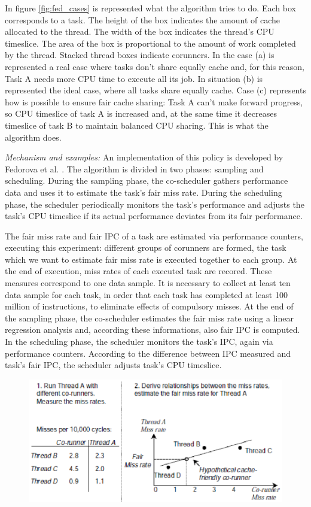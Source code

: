 \begin{description}
In figure \ref{fig:fed_cases} is represented what the algorithm tries to do. Each box corresponds to a task. The height of the box indicates the amount of
cache allocated to the thread. The width of the box indicates the thread's CPU timeslice. The area of the box is proportional to the amount of work 
completed by the thread. Stacked thread boxes indicate corunners. In the case (a) is represented a real case where tasks don't share equally cache and, for 
this reason, Task A needs more CPU time to execute all its job. In situation (b) is represented the ideal case, where all tasks share equally 
cache. Case (c) represents how is possible to ensure fair cache sharing: Task A can't make forward progress, so CPU timeslice of task A is increased 
and, at the same time it decreases timeslice of task B to maintain balanced CPU sharing. This is what the algorithm does. 

\textit{Mechanism and examples:} An implementation of this policy is developed by Fedorova et al. \cite{fedorova}. The algorithm is divided in two phases: 
sampling and scheduling. During the sampling phase, the co-scheduler gathers performance data and uses it to estimate the task's fair miss rate. During the 
scheduling phase, the scheduler periodically monitors the task's performance and adjusts the task's CPU timeslice if its actual performance deviates from 
its fair performance.

The fair miss rate and fair IPC of a task are estimated via performance counters, executing this experiment: different groups of corunners are formed, 
the task which we want to estimate fair miss rate is executed together to each group. At the end of execution, miss rates of each executed task are 
recored. These measures correspond to one data sample. It is necessary to collect at least ten data sample for each task, in order that each task has 
completed at least 100 million of instructions, to eliminate effects of compulsory misses. At the end of the sampling phase, the co-scheduler estimates the 
fair miss rate using a linear regression analysis and, according these informations, also fair IPC is computed. In the scheduling phase, the scheduler 
monitors the task's IPC, again via performance counters. According to the difference between IPC measured and task's fair IPC, the scheduler adjusts task's 
CPU timeslice.

\begin{figure}[htbp]
\centering
\includegraphics[width=\widefigure]{images/fedorova.eps}
\caption{}
\label{fig:fedorova}
\end{figure}



\end{description}
